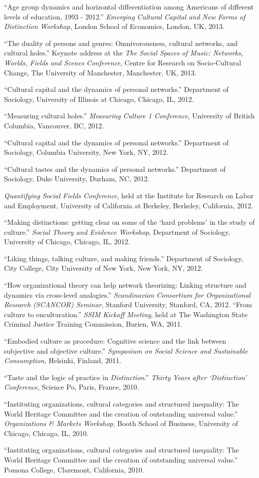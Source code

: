 \ind ``Age group dynamics and horizontal differentiation among Americans of different levels of education, 1993 - 2012.'' \emph{Emerging Cultural Capital and New Forms of Distinction Workshop}, London School of Economics, London, UK, 2013.

\ind ``The duality of persons and genres: Omnivorousness, cultural networks, and cultural holes.'' Keynote address at the \emph{The Social Spaces of Music: Networks, Worlds, Fields and Scenes Conference}, Centre for Research on Socio-Cultural Change, The University of Manchester, Manchester, UK, 2013.

\ind ``Cultural capital and the dynamics of personal networks.'' Department of Sociology, University of Illinois at Chicago, Chicago, IL, 2012.

\ind ``Measuring cultural holes.'' \emph{Measuring Culture 1 Conference}, University of British Columbia, Vancouver, BC, 2012.

\ind ``Cultural capital and the dynamics of personal networks.'' Department of Sociology, Columbia University, New York, NY, 2012.

\ind``Cultural tastes and the dynamics of personal networks.'' Department of Sociology, Duke University, Durham, NC, 2012.

\ind \emph{Quantifying Social Fields Conference}, held at the Institute for Research on Labor and Employment, University of California at Berkeley, Berkeley, California, 2012.

\ind ``Making distinctions: getting clear on some of the ‘hard problems’ in the study of culture.'' \emph{Social Theory and Evidence Workshop}, Department of Sociology, University of Chicago, Chicago, IL, 2012.

\ind ``Liking things, talking culture, and making friends.'' Department of Sociology, City College, City University of New York, New York, NY, 2012.

\ind ``How organizational theory can help network theorizing: Linking structure and dynamics via cross-level analogies.'' \emph{Scandinavian Consortium for Organizational Research (SCANCOR) Seminar}, Stanford University, Stanford, CA, 2012.
\ind  ``From culture to enculturation.''  \emph{SSIM Kickoff Meeting}, held at The Washington State Criminal Justice Training Commission, Burien, WA, 2011.

\ind  ``Embodied culture as procedure: Cognitive science and the link between subjective and objective culture.''  \emph{Symposium on Social Science and Sustainable Consumption}, Helsinki, Finland, 2011.

\ind  ``Taste and the logic of practice in \emph{Distinction}.'' \emph{Thirty Years after `Distinction' Conference},  Science Po, Paris, France, 2010.

\ind  ``Instituting organizations, cultural categories and structured inequality: The World Heritage Committee and the creation of outstanding universal value.'' \emph{Organizations \& Markets Workshop}, Booth School of Business, University of Chicago, Chicago, IL, 2010.

\ind  ``Instituting organizations, cultural categories and structured inequality: The World Heritage Committee and the creation of outstanding universal value.'' Pomona College, Claremont, California, 2010.
